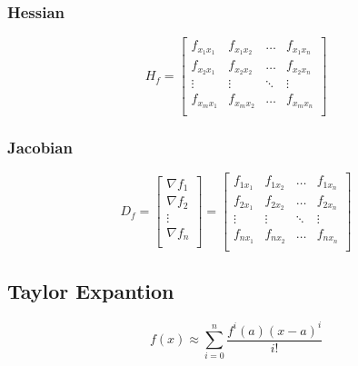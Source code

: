 \documentclass{article}
\begin{document}
        \subsubsection{Hessian}
        \begin{equation}
            H_f = \begin{bmatrix} 
                f_{x_1x_1} & f_{x_1x_2} & \hdots & f_{x_1x_n} \\
                f_{x_2x_1} & f_{x_2x_2} & \hdots & f_{x_2x_n} \\
                \vdots & \vdots & \ddots & \vdots \\
                f_{x_mx_1} & f_{x_mx_2} & \hdots & f_{x_mx_n} \\
            \end{bmatrix}
        \end{equation}

        \subsubsection{Jacobian}
        \begin{equation}
            D_f = \begin{bmatrix} 
                \nabla f_1 \\
                \nabla f_2 \\
                \vdots \\
                \nabla f_n \\
            \end{bmatrix} = \begin{bmatrix}
                f_{1x_1} & f_{1x_2} & \hdots & f_{1x_n} \\
                f_{2x_1} & f_{2x_2} & \hdots & f_{2x_n} \\
                \vdots & \vdots & \ddots & \vdots  \\
                f_{nx_1} & f_{nx_2} & \hdots & f_{nx_n} \\
            \end{bmatrix}
        \end{equation}

        \subsection{Taylor Expantion}

        \begin{equation}
            f(x) \approx \sum_{i=0}^n \frac {f^i(a)(x-a)^i} {i!}
        \end{equation}
\end{document}
